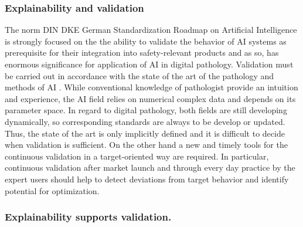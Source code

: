 \subsubsection{Explainability and validation }


The norm DIN DKE German Standardization Roadmap on Artificial Intelligence \citet{DIN_DKE_Roadmap} is strongly focused on the the ability to validate the behavior of AI systems as prerequisite for their integration into safety-relevant products and as so, has enormous significance for application of AI in digital pathology. 
Validation must be carried out in accordance with the state of the art of the pathology and methods of AI \cite{DIN_SPEC_13288}. While conventional knowledge of pathologist provide an intuition and experience, the AI field relies on numerical complex data and depends on its parameter space. In regard to digital pathology, both fields are still developing dynamically, so corresponding standards are always to be develop or updated. Thus, the state of the art is only implicitly defined and it is difficult to decide when validation is sufficient. On the other hand a new and timely tools for the continuous validation in a target-oriented way are required. In particular, continuous validation after market launch and through every day practice by the expert users should help to detect deviations from target behavior and identify potential for optimization.

\subsubsection{Explainability supports validation.} 

